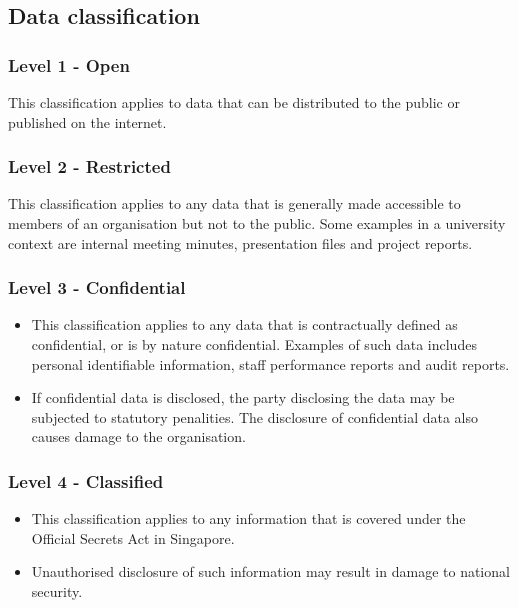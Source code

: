 \documentclass[11pt]{article}
\begin{document}
\subsection{Data classification}
\label{sec:org86cc0ab}

\subsubsection{Level 1 - Open}
\label{sec:orgbb0c35b}
This classification applies to data that can be distributed to the public or published on the internet.

\subsubsection{Level 2 - Restricted}
\label{sec:orgf1191f9}
This classification applies to any data that is generally made accessible to members of an organisation but not to the public. Some examples in a university context are internal meeting minutes, presentation files and project reports.

\subsubsection{Level 3 - Confidential}
\label{sec:org9d6aff1}
\begin{itemize}
\item This classification applies to any data that is contractually defined as confidential, or is by nature confidential. Examples of such data includes personal identifiable information, staff performance reports and audit reports.
\item If confidential data is disclosed, the party disclosing the data may be subjected to statutory penalities. The disclosure of confidential data also causes damage to the organisation.
\end{itemize}

\subsubsection{Level 4 - Classified}
\label{sec:orgdb3f9c9}
\begin{itemize}
\item This classification applies to any information that is covered under the Official Secrets Act in Singapore.
\item Unauthorised disclosure of such information may result in damage to national security.
\end{itemize}
\end{document}
